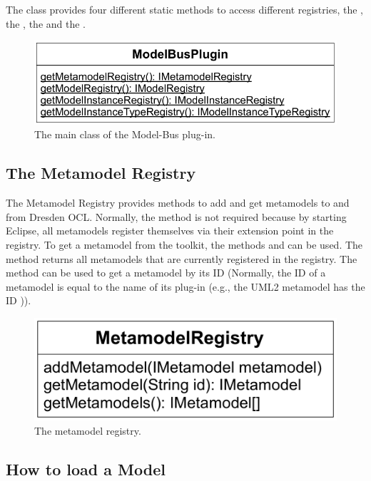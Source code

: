The class provides four different static methods to access different registries,
the , the , the 
 and the .

\begin{figure}[!b]
	\centering
	\includegraphics[width=.8\linewidth]{figures/integration/modelBusPlugin}
	\caption{The main class of the Model-Bus plug-in.}
	\label{pic:integration:modelBusPlugin}
\end{figure}


\subsection{The Metamodel Registry}

The Metamodel Registry provides methods to add and get metamodels to and from 
Dresden OCL. Normally, the method  is not required
because by starting Eclipse, all metamodels register themselves via their 
extension point in the registry. To get a metamodel from the toolkit, the
methods  and  can be used. 
The method  returns all metamodels that are currently 
registered in the registry. The method  can be 
used to get a metamodel by its ID (Normally, the ID of a metamodel is equal to
the name of its plug-in (e.g., the \acs{UML}2 metamodel has the ID 
)).

\begin{figure}[!b]
	\centering
	\includegraphics[width=.55\linewidth]{figures/integration/metaModelRegistry}
	\caption{The metamodel registry.}
	\label{pic:integration:metaModelRegistry}
\end{figure}


\subsection{How to load a Model}

